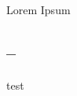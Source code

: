\documentclass[tom-ari]{subfile}
\begin{document}
	
	\chapter[1C]{}
	
	Lorem Ipsum
	
	\section[1C--1D]{--}
	
	test
	
\end{document}
